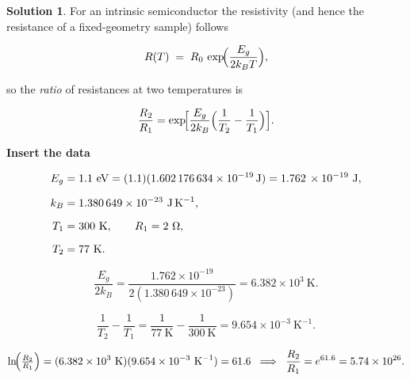 \documentclass[12pt]{article}
\theoremstyle{definition} %
\newtheorem{solution}{Solution}
\theoremstyle{plain} %
\begin{document}
                  \begin{solution}
                    For an intrinsic semiconductor the resistivity (and hence the resistance
                    of a fixed‑geometry sample) follows
                    
                    \[
                    R(T)\;=\; R_0\,\exp\!\Bigl(\frac{E_g}{2k_B T}\Bigr),
                    \]
                    
                    so the \emph{ratio} of resistances at two temperatures is
                    
                    \[
                    \frac{R_2}{R_1}
                      = \exp\!\Bigl[\frac{E_g}{2k_B}\Bigl(\frac{1}{T_2}-\frac{1}{T_1}\Bigr)\Bigr].
                    \]
                    
                    \medskip
                    \textbf{Insert the data}
                    
                    \[
                    \begin{aligned}
                    E_g &= 1.1\ \text{eV}
                          = (1.1)(1.602\,176\,634\times10^{-19}\,\text{J})
                          = 1.762\,\times10^{-19}\ \text{J}, \\[6pt]
                    k_B &= 1.380\,649\times10^{-23}\ \text{J\,K}^{-1}, \\[6pt]
                    T_1 &= 300\ \text{K}, \qquad R_1 = 2\ \Omega, \\[6pt]
                    T_2 &= 77\ \text{K}.
                    \end{aligned}
                    \]
                    
                    \[
                    \frac{E_g}{2k_B} = 
                    \frac{1.762\times10^{-19}}{2(1.380\,649\times10^{-23})}
                    = 6.382\times10^{3}\ \text{K}.
                    \]
                    
                    \[
                    \frac{1}{T_2}-\frac{1}{T_1}
                      = \frac{1}{77\ \text{K}}-\frac{1}{300\ \text{K}}
                      = 9.654\times10^{-3}\ \text{K}^{-1}.
                    \]
                    
                    \[
                    \ln\!\Bigl(\tfrac{R_2}{R_1}\Bigr)
                      = (6.382\times10^{3}\ \text{K})(9.654\times10^{-3}\ \text{K}^{-1})
                      = 61.6
                    \;\;\Longrightarrow\;\;
                    \frac{R_2}{R_1}=e^{61.6}=5.74\times10^{26}.
                    \]
                    

\end{solution}
\end{document}
